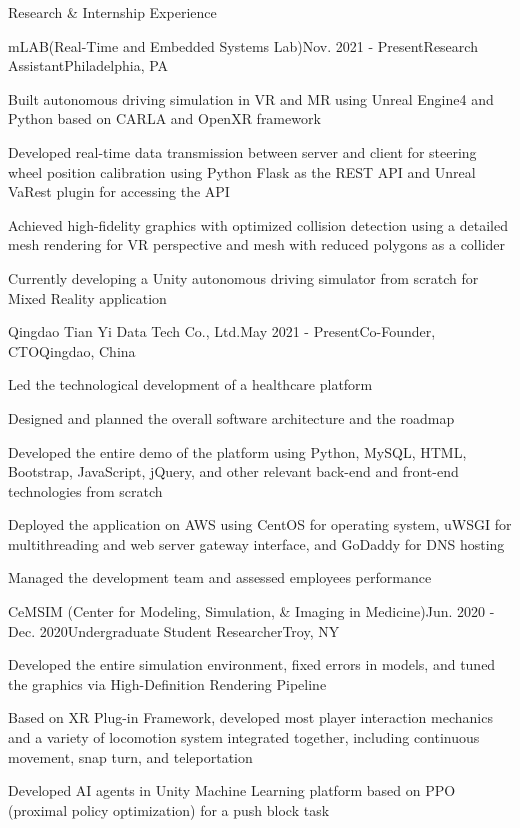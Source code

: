 \documentclass{resume} %
\begin{document}
\begin{rSection}{Research \& Internship Experience}

\begin{rSubsection}{mLAB(Real-Time and Embedded Systems Lab)}{Nov. 2021  - Present}{Research Assistant}{Philadelphia, PA}
\item Built autonomous driving simulation in VR and MR using Unreal Engine4 and Python based on CARLA and OpenXR framework
\item Developed real-time data transmission between server and client for steering wheel position calibration using Python Flask as the REST API and Unreal VaRest plugin for accessing the API 
\item Achieved high-fidelity graphics with optimized collision detection using a detailed mesh rendering for VR perspective and mesh with reduced polygons as a collider
\item Currently developing a Unity autonomous driving simulator from scratch for Mixed Reality application
\end{rSubsection}


\begin{rSubsection}{Qingdao Tian Yi Data Tech Co., Ltd.}{May 2021 - Present}{Co-Founder, CTO}{Qingdao, China}
\item Led the technological development of a healthcare platform
\item Designed and planned the overall software architecture and the roadmap
\item Developed the entire demo of the platform using Python, MySQL, HTML, Bootstrap, JavaScript, jQuery, and other relevant back-end and front-end technologies from scratch
\item Deployed the application on AWS using CentOS for operating system, uWSGI for multithreading and web server gateway interface, and GoDaddy for DNS hosting
\item Managed the development team and assessed employees performance
\end{rSubsection}


\begin{rSubsection}{CeMSIM (Center for Modeling, Simulation, \& Imaging in Medicine)}{Jun. 2020 - Dec. 2020}{Undergraduate Student Researcher}{Troy, NY}
\item Developed the entire simulation environment, fixed errors in models, and tuned the graphics via High-Definition Rendering Pipeline
\item Based on XR Plug-in Framework, developed most player interaction mechanics and a variety of locomotion system integrated together, including continuous movement, snap turn, and teleportation
\item Developed AI agents in Unity Machine Learning platform based on PPO (proximal policy optimization) for a push block task
\end{rSubsection}


\end{rSection}
\end{document}
